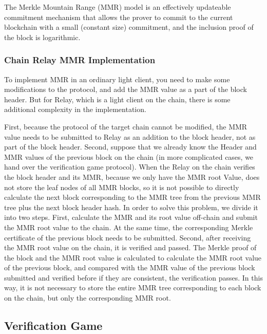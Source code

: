The Merkle Mountain Range (MMR) model is an effectively updateable commitment mechanism that allows the prover to commit to the current blockchain with a small (constant size) commitment, and the inclusion proof of the block is logarithmic.


\subsubsection*{Chain Relay MMR Implementation}

To implement MMR in an ordinary light client, you need to make some modifications to the protocol, and add the MMR value as a part of the block header. But for Relay, which is a light client on the chain, there is some additional complexity in the implementation.

First, because the protocol of the target chain cannot be modified, the MMR value needs to be submitted to Relay as an addition to the block header, not as part of the block header. Second, suppose that we already know the Header and MMR values ​​of the previous block on the chain (in more complicated cases, we hand over the verification game protocol). When the Relay on the chain verifies the block header and its MMR, because we only have the MMR root Value, does not store the leaf nodes of all MMR blocks, so it is not possible to directly calculate the next block corresponding to the MMR tree from the previous MMR tree plus the next block header hash. In order to solve this problem, we divide it into two steps. First, calculate the MMR and its root value off-chain and submit the MMR root value to the chain. At the same time, the corresponding Merkle certificate of the previous block needs to be submitted. Second, after receiving the MMR root value on the chain, it is verified and passed. The Merkle proof of the block and the MMR root value is calculated to calculate the MMR root value of the previous block, and compared with the MMR value of the previous block submitted and verified before if they are consistent, the verification passes. In this way, it is not necessary to store the entire MMR tree corresponding to each block on the chain, but only the corresponding MMR root.


\subsection*{Verification Game}


